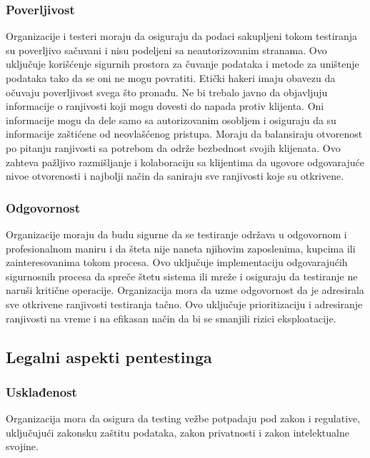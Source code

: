 \documentclass[a4paper,12pt]{article}
\begin{document}
\subsubsection*{Poverljivost} 
Organizacije i testeri moraju da osiguraju da podaci sakupljeni tokom testiranja su poverljivo sačuvani i nisu podeljeni sa neautorizovanim stranama. Ovo uključuje korišćenje sigurnih prostora za čuvanje podataka i metode za uništenje podataka tako da se oni ne mogu povratiti. Etički hakeri imaju obavezu da očuvaju poverljivost svega što pronađu. Ne bi trebalo javno da objavljuju informacije o ranjivosti koji mogu dovesti do napada protiv klijenta. Oni informacije mogu da dele samo sa autorizovanim osobljem i osiguraju da su informacije zaštićene od neovlašćenog pristupa. Moraju da balansiraju otvorenost po pitanju ranjivosti sa potrebom da održe bezbednost svojih klijenata. Ovo zahteva pažljivo razmišljanje i kolaboraciju sa klijentima da ugovore odgovarajuće nivoe otvorenosti i najbolji način da saniraju sve ranjivosti koje su otkrivene\cite{ethical-legal-pentesting}.
\subsubsection*{Odgovornost}
Organizacije moraju da budu sigurne da se testiranje održava u odgovornom i profesionalnom maniru i da šteta nije naneta njihovim zaposlenima, kupcima ili zainteresovanima tokom procesa. Ovo uključuje implementaciju odgovarajućih sigurnosnih procesa da spreče štetu sistema ili mreže i osiguraju da testiranje ne naruši kritične operacije. Organizacija mora da uzme odgovornost da je adresirala sve otkrivene ranjivosti testiranja tačno. Ovo uključuje prioritizaciju i adresiranje ranjivosti na vreme i na efikasan način da bi se smanjili rizici eksploatacije\cite{ethical-legal-pentesting}.
\subsection{Legalni aspekti pentestinga}

\subsubsection*{Usklađenost}
Organizacija mora da osigura da testing vežbe potpadaju pod zakon i regulative, uključujući zakonsku zaštitu podataka, zakon privatnosti i zakon intelektualne svojine\cite{ethical-legal-pentesting}.
\end{document}
